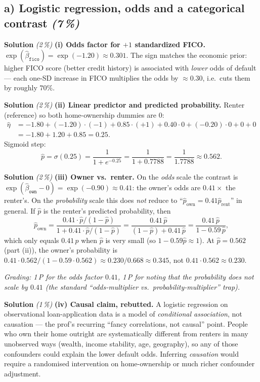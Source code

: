 \documentclass[11pt,a4paper]{article}
\newcommand{\subpoints}[1]{\textit{(#1\,\%)}}
\newcommand{\sol}{\noindent\textbf{Solution}}
\begin{document}
\subsection*{a) Logistic regression, odds and a categorical contrast \subpoints{7}}

\sol{} \subpoints{2} \textbf{(i) Odds factor for $+1$ standardized FICO.}
$\exp(\hat\beta_{\texttt{fico}}) = \exp(-1.20) \approx \boxed{0.301}$. The sign matches the economic
prior: higher FICO score (better credit history) is associated with \emph{lower} odds of default ---
each one-SD increase in FICO multiplies the odds by $\approx 0.30$, i.e.\ cuts them by roughly
$70\%$.

\medskip
\sol{} \subpoints{2} \textbf{(ii) Linear predictor and predicted probability.} Renter (reference) so
both home-ownership dummies are $0$:
\begin{align*}
\hat\eta &= -1.80 + (-1.20)\cdot(-1) + 0.85\cdot(+1) + 0.40\cdot 0 + (-0.20)\cdot 0 + 0 + 0 \\
   &= -1.80 + 1.20 + 0.85 = \boxed{0.25}.
\end{align*}
Sigmoid step:
$$\hat p = \sigma(0.25) = \frac{1}{1 + e^{-0.25}} = \frac{1}{1 + 0.7788} = \frac{1}{1.7788}
   \approx \boxed{0.562}.$$

\medskip
\sol{} \subpoints{2} \textbf{(iii) Owner vs.\ renter.} On the \emph{odds} scale the contrast is
$\exp(\hat\beta_{\texttt{own}} - 0) = \exp(-0.90) \approx \boxed{0.41}$: the owner's odds are
$0.41\times$ the renter's. On the \emph{probability} scale this does \emph{not} reduce to
``$\hat p_{\text{own}} = 0.41 \hat p_{\text{rent}}$'' in general. If $\hat p$ is the renter's
predicted probability, then
$$\hat p_{\text{own}} = \frac{0.41\cdot \hat p / (1-\hat p)}{1 + 0.41\cdot\hat p/(1-\hat p)}
   = \frac{0.41\,\hat p}{(1-\hat p) + 0.41\,\hat p} = \frac{0.41\,\hat p}{1 - 0.59\,\hat p},$$
which only equals $0.41\,\hat p$ when $\hat p$ is very small (so $1 - 0.59\hat p \approx 1$). At
$\hat p = 0.562$ (part (ii)), the owner's probability is $0.41\cdot 0.562/(1 - 0.59\cdot 0.562)
\approx 0.230/0.668 \approx 0.345$, not $0.41\cdot 0.562 \approx 0.230$.

\noindent\emph{Grading: 1\,P for the odds factor $0.41$, 1\,P for noting that the probability does
not scale by $0.41$ (the standard ``odds-multiplier vs.\ probability-multiplier'' trap).}

\medskip
\sol{} \subpoints{1} \textbf{(iv) Causal claim, rebutted.} A logistic regression on observational
loan-application data is a model of \emph{conditional association}, not causation --- the prof's
recurring ``fancy correlations, not causal'' point. People who own their home outright are
systematically different from renters in many unobserved ways (wealth, income stability, age,
geography), so any of those confounders could explain the lower default odds. Inferring
\emph{causation} would require a randomised intervention on home-ownership or much richer
confounder adjustment.
\end{document}
